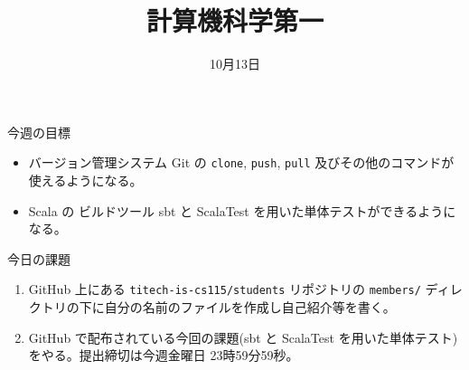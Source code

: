 \documentclass[a4paper]{article}
\title{計算機科学第一}
\date{10月13日}
\begin{document}
\maketitle

\noindent
今週の目標
\begin{itemize}
\item バージョン管理システム Git の \texttt{clone}, \texttt{push}, \texttt{pull} 及びその他のコマンドが使えるようになる。
\item Scala の ビルドツール sbt と ScalaTest を用いた単体テストができるようになる。
\end{itemize}

\noindent
今日の課題
\begin{enumerate}
\item GitHub 上にある \verb|titech-is-cs115/students| リポジトリの \verb|members/| ディレクトリの下に自分の名前のファイルを作成し自己紹介等を書く。
\item GitHub で配布されている今回の課題(sbt と ScalaTest を用いた単体テスト)をやる。提出締切は今週金曜日 23時59分59秒。
\end{enumerate}
\end{document}
